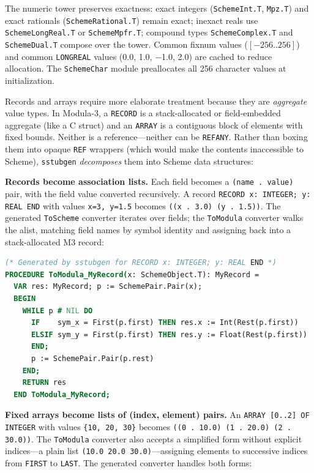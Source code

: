 \documentclass[11pt]{article}
\begin{document}
The numeric tower preserves exactness: exact integers (\texttt{SchemeInt.T},
\texttt{Mpz.T}) and exact rationals (\texttt{SchemeRational.T}) remain exact;
inexact reals use \texttt{SchemeLongReal.T} or \texttt{SchemeMpfr.T};
compound types \texttt{SchemeComplex.T} and \texttt{SchemeDual.T} compose
over the tower.  Common fixnum values ($[-256..256]$) and common
\texttt{LONGREAL} values (0.0, 1.0, $-$1.0, 2.0) are cached to reduce
allocation.  The \texttt{SchemeChar} module preallocates all
256 character values at initialization.

Records and arrays require more elaborate treatment because they are
\emph{aggregate} value types.  In Modula-3, a \texttt{RECORD} is a
stack-allocated or field-embedded aggregate (like a C struct) and an
\texttt{ARRAY} is a contiguous block of elements with fixed bounds.
Neither is a reference---neither can be \texttt{REFANY}.  Rather than
boxing them into opaque \texttt{REF} wrappers (which would make the
contents inaccessible to Scheme), \texttt{sstubgen} \emph{decomposes}
them into Scheme data structures:

\textbf{Records become association lists.}  Each field becomes a
\texttt{(name . value)} pair, with the field value converted
recursively.  A record \texttt{RECORD x: INTEGER; y: REAL END} with
values \texttt{x=3, y=1.5} becomes \texttt{((x . 3.0) (y . 1.5))}.
The generated \texttt{ToScheme} converter iterates over fields; the
\texttt{ToModula} converter walks the alist, matching field names by
symbol identity and assigning back into a stack-allocated M3 record:

\begin{lstlisting}[language=Modula3]
(* Generated by sstubgen for RECORD x: INTEGER; y: REAL END *)
PROCEDURE ToModula_MyRecord(x: SchemeObject.T): MyRecord =
  VAR res: MyRecord; p := SchemePair.Pair(x);
  BEGIN
    WHILE p # NIL DO
      IF    sym_x = First(p.first) THEN res.x := Int(Rest(p.first))
      ELSIF sym_y = First(p.first) THEN res.y := Float(Rest(p.first))
      END;
      p := SchemePair.Pair(p.rest)
    END;
    RETURN res
  END ToModula_MyRecord;
\end{lstlisting}

\textbf{Fixed arrays become lists of (index, element) pairs.}  An
\texttt{ARRAY [0..2] OF INTEGER} with values \texttt{\{10, 20, 30\}}
becomes \texttt{((0 . 10.0) (1 . 20.0) (2 . 30.0))}.  The
\texttt{ToModula} converter also accepts a simplified form without
explicit indices---a plain list \texttt{(10.0 20.0 30.0)}---assigning
elements to successive indices from \texttt{FIRST} to \texttt{LAST}.
The generated converter handles both forms:
\end{document}
